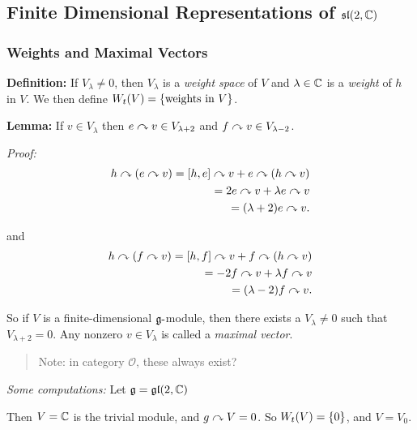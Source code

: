 \hypertarget{finite-dimensional-representations-of-liesl2-cc}{%
\subsection{\texorpdfstring{Finite Dimensional Representations of
\({\mathfrak{sl}}(2, {\mathbb{C}})\)}{Finite Dimensional Representations of \textbackslash liesl(2, \textbackslash CC)}}\label{finite-dimensional-representations-of-liesl2-cc}}

\hypertarget{weights-and-maximal-vectors}{%
\subsubsection{Weights and Maximal
Vectors}\label{weights-and-maximal-vectors}}

\textbf{Definition:} If \(V_\lambda \neq 0\), then \(V_\lambda\) is a
\emph{weight space} of \(V\) and \(\lambda \in {\mathbb{C}}\) is a \emph{weight}
of \(h\) in \(V\). We then define
\(W_t(V) = \left\{{\text{weights in } V}\right\}\).

\textbf{Lemma:} If \(v\in V_\lambda\) then
\(e\curvearrowright v \in V_{\lambda + 2}\) and
\(f\curvearrowright v \in V_{\lambda - 2}\).

\emph{Proof:} \begin{align*}
h \curvearrowright (e\curvearrowright v) = [h, e] \curvearrowright v + e\curvearrowright (h \curvearrowright v) \\
= 2e \curvearrowright v + \lambda e \curvearrowright v \\
= (\lambda +2 )e \curvearrowright v
.\end{align*}

and \begin{align*}
h \curvearrowright (f\curvearrowright v) = [h, f] \curvearrowright v + f\curvearrowright (h \curvearrowright v) \\
= -2f \curvearrowright v + \lambda f \curvearrowright v \\
= (\lambda -2 )f \curvearrowright v
.\end{align*}

So if \(V\) is a finite-dimensional \({\mathfrak{g}}{\hbox{-}}\)module, then there
exists a \(V_\lambda \neq 0\) such that \(V_{\lambda + 2} = 0\). Any
nonzero \(v\in V_{\lambda}\) is called a \emph{maximal vector}.

\begin{quote}
Note: in category \(\mathcal O\), these always exist?
\end{quote}

\emph{Some computations:} Let \({\mathfrak{g}} = {\mathfrak{gl}}(2, {\mathbb{C}})\)

Then \(V = {\mathbb{C}}\) is the trivial module, and \(g\curvearrowright V = 0\). So
\(W_t(V) = \left\{{0}\right\}\), and \(V = V_0\).


